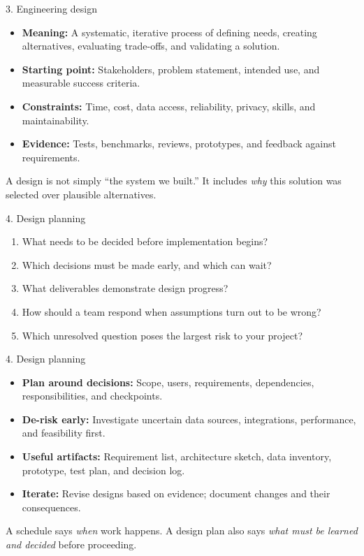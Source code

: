 \documentclass[11pt,aspectratio=43]{beamer}
\begin{document}
\begin{frame}{3. Engineering design}
\begin{itemize}
  \item \textbf{Meaning:} A systematic, iterative process of defining needs, creating alternatives, evaluating trade-offs, and validating a solution.
  \item \textbf{Starting point:} Stakeholders, problem statement, intended use, and measurable success criteria.
  \item \textbf{Constraints:} Time, cost, data access, reliability, privacy, skills, and maintainability.
  \item \textbf{Evidence:} Tests, benchmarks, reviews, prototypes, and feedback against requirements.
\end{itemize}
\begin{block}{}
A design is not simply ``the system we built.'' It includes \emph{why} this solution was selected over plausible alternatives.
\end{block}
\end{frame}

\begin{frame}{4. Design planning}
\begin{enumerate}
  \item What needs to be decided before implementation begins?
  \item Which decisions must be made early, and which can wait?
  \item What deliverables demonstrate design progress?
  \item How should a team respond when assumptions turn out to be wrong?
  \item Which unresolved question poses the largest risk to your project?
\end{enumerate}
\end{frame}

\begin{frame}{4. Design planning}
\begin{itemize}
  \item \textbf{Plan around decisions:} Scope, users, requirements, dependencies, responsibilities, and checkpoints.
  \item \textbf{De-risk early:} Investigate uncertain data sources, integrations, performance, and feasibility first.
  \item \textbf{Useful artifacts:} Requirement list, architecture sketch, data inventory, prototype, test plan, and decision log.
  \item \textbf{Iterate:} Revise designs based on evidence; document changes and their consequences.
\end{itemize}
\begin{block}{}
A schedule says \emph{when} work happens. A design plan also says \emph{what must be learned and decided} before proceeding.
\end{block}
\end{frame}
\end{document}
